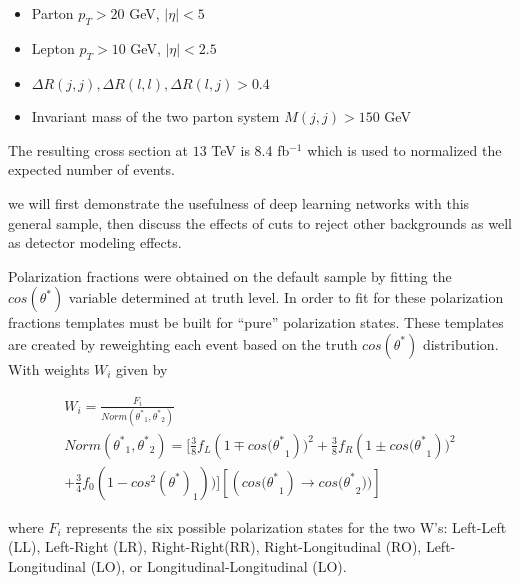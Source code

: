 \documentclass[10pt,twocolumn]{article}
\def\ts{\ensuremath{ \theta^{*} }\xspace}
\def\cts{\ensuremath{ cos(\ts) }\xspace}
\def\ctsnb{\ensuremath{ cos(\ts }\xspace}
\def\ctsSqnb{\ensuremath{ cos^{2}(\ts) }\xspace}
\def\dR{\ensuremath{ \Delta R }\xspace}
\begin{document}
\begin{itemize}
\item Parton $p_T > 20$ GeV, $|\eta| < 5$
\item Lepton $p_T > 10$ GeV, $|\eta| < 2.5$
\item $\dR (j,j),\dR (l,l),\dR (l,j) > 0.4$
\item Invariant mass of the two parton system $M(j,j)> 150$ GeV
\end{itemize}

The resulting cross section at $13$ TeV is 8.4 fb$^{-1}$ which is used to normalized the expected number of events.

we will first demonstrate the usefulness of deep learning networks with this general sample, then discuss the effects of cuts to reject other backgrounds as well as detector modeling effects. 

Polarization fractions were obtained on the default sample by fitting the \cts variable determined at truth level. In order to fit for these polarization fractions templates must be built for ``pure'' polarization states. These templates are created by reweighting each event based on the truth \cts distribution. With weights $W_i$ given by

\begin{multline}
W_i = \frac{ F_i }{Norm(\ts_1,\ts_2)}\\
Norm(\ts_1,\ts_2)=[ \frac{3}{8} f_L (1 \mp \ctsnb_1))^2 + \frac{3}{8} f_R (1 \pm \ctsnb_1))^ 2\\ 
+\frac{3}{4} f_0 (1 - \ctsSqnb_1))]  [(\ctsnb_1) \rightarrow \ctsnb_2))] 
\end{multline}

where $F_i$ represents the six possible polarization states for the two W's: Left-Left (LL), Left-Right (LR), Right-Right(RR), Right-Longitudinal (RO), Left-Longitudinal (LO), or Longitudinal-Longitudinal (LO).
\end{document}
